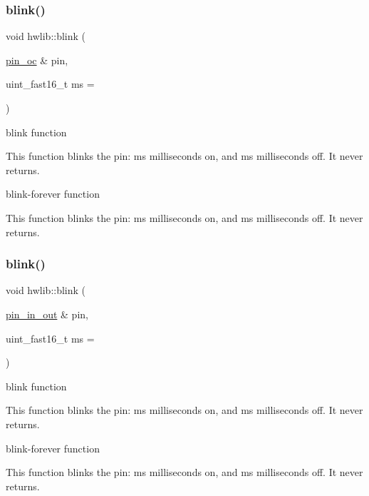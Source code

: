 \subsubsection{\texorpdfstring{blink()}{blink()}\hspace{0.1cm}{\footnotesize\ttfamily [2/6]}}
{\footnotesize\ttfamily void hwlib\+::blink (\begin{DoxyParamCaption}\item[{\hyperlink{classhwlib_1_1pin__oc}{pin\+\_\+oc} \&}]{pin,  }\item[{uint\+\_\+fast16\+\_\+t}]{ms = {} }\end{DoxyParamCaption})}



blink function 

This function blinks the pin\+: ms milliseconds on, and ms milliseconds off. It never returns.

blink-\/forever function

This function blinks the pin\+: ms milliseconds on, and ms milliseconds off. It never returns. \mbox{\label{namespacehwlib_a76528f4237960700ba546384da8d493d}} 
\subsubsection{\texorpdfstring{blink()}{blink()}\hspace{0.1cm}{\footnotesize\ttfamily [3/6]}}
{\footnotesize\ttfamily void hwlib\+::blink (\begin{DoxyParamCaption}\item[{\hyperlink{classhwlib_1_1pin__in__out}{pin\+\_\+in\+\_\+out} \&}]{pin,  }\item[{uint\+\_\+fast16\+\_\+t}]{ms = {} }\end{DoxyParamCaption})}



blink function 

This function blinks the pin\+: ms milliseconds on, and ms milliseconds off. It never returns.

blink-\/forever function

This function blinks the pin\+: ms milliseconds on, and ms milliseconds off. It never returns. \mbox{\label{namespacehwlib_ab23acad933a5226df042258d51580e12}} 
